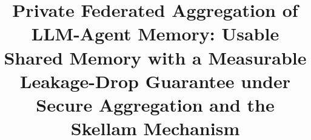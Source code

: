 \documentclass[pdflatex,sn-mathphys-num,12pt]{sn-jnl}
\theoremstyle{thmstyleone}%
\theoremstyle{thmstyletwo}%
\theoremstyle{thmstylethree}%
\begin{document}
\title[Private Federated Aggregation of LLM-Agent Memory]{Private Federated
Aggregation of LLM-Agent Memory: Usable Shared Memory with a Measurable
Leakage-Drop Guarantee under Secure Aggregation and the Skellam Mechanism}

\author*[1]{ }

\end{document}
